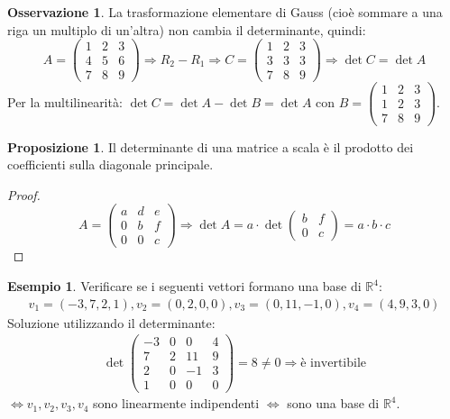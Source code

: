 \documentclass[a4paper]{article}
\theoremstyle{definition}
\newtheorem*{oss}{Osservazione}
\newtheorem*{es}{Esempio}
\newtheorem*{prop}{Proposizione}
\begin{document}
\begin{oss}
	La trasformazione elementare di Gauss (cioè sommare a una riga un multiplo di un'altra) non cambia il determinante, quindi:
	\[ A = \begin{pmatrix}
		1 & 2 & 3 \\
		4 & 5 & 6 \\
		7 & 8 & 9
	\end{pmatrix} \Rightarrow R_2 - R_1 \Rightarrow C = \begin{pmatrix}
		1 & 2 & 3 \\
		3 & 3 & 3 \\
		7 & 8 & 9
	\end{pmatrix} \Rightarrow \det C = \det A\]
	Per la multilinearità: $\det C = \det A - \det B = \det A$ con $B = \begin{pmatrix}
		1 & 2 & 3 \\
		1 & 2 & 3 \\
		7 & 8 & 9
	\end{pmatrix}$.
\end{oss}

\begin{prop}
	Il determinante di una matrice a scala è il prodotto dei coefficienti sulla diagonale principale.
\end{prop}
\begin{proof}
	\[ A = \begin{pmatrix}
		a & d & e \\
		0 & b & f \\
		0 & 0 & c
	\end{pmatrix} \Rightarrow \det A = a \cdot \det \begin{pmatrix}
		b & f \\
		0 & c
	\end{pmatrix} = a \cdot b \cdot c\]
\end{proof}

\begin{es}
	Verificare se i seguenti vettori formano una base di $\mathbb{R}^4$:
	\begin{align*}
		v_1 = ( - 3, 7, 2, 1), v_2 = (0, 2, 0, 0), v_3 = (0, 11, - 1, 0), v_4 = (4, 9, 3, 0)
	\end{align*}
	Soluzione utilizzando il determinante:
	\begin{align*}
		\det \begin{pmatrix}
			     - 3 & 0 & 0   & 4 \\
			     7   & 2 & 11  & 9 \\
			     2   & 0 & - 1 & 3 \\
			     1   & 0 & 0   & 0
		     \end{pmatrix} = 8 \ne 0 \Rightarrow \text{è invertibile}
	\end{align*}
	$\Leftrightarrow v_1, v_2, v_3, v_4$ sono linearmente indipendenti $\Leftrightarrow$ sono una base di $\mathbb{R}^4$.
\end{es}
\end{document}
